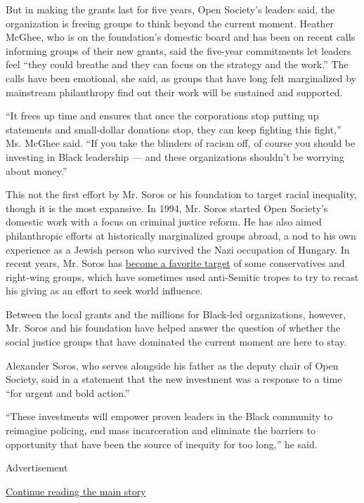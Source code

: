 But in making the grants last for five years, Open Society's leaders
said, the organization is freeing groups to think beyond the current
moment. Heather McGhee, who is on the foundation's domestic board and
has been on recent calls informing groups of their new grants, said the
five-year commitments let leaders feel ``they could breathe and they can
focus on the strategy and the work.'' The calls have been emotional, she
said, as groups that have long felt marginalized by mainstream
philanthropy find out their work will be sustained and supported.

``It frees up time and ensures that once the corporations stop putting
up statements and small-dollar donations stop, they can keep fighting
this fight,'' Ms. McGhee said. ``If you take the blinders of racism off,
of course you should be investing in Black leadership --- and these
organizations shouldn't be worrying about money.''

This not the first effort by Mr. Soros or his foundation to target
racial inequality, though it is the most expansive. In 1994, Mr. Soros
started Open Society's domestic work with a focus on criminal justice
reform. He has also aimed philanthropic efforts at historically
marginalized groups abroad, a nod to his own experience as a Jewish
person who survived the Nazi occupation of Hungary. In recent years, Mr.
Soros has
\href{https://www.nytimes.com/2018/10/31/us/politics/george-soros-bombs-trump.html}{become
a favorite target} of some conservatives and right-wing groups, which
have sometimes used anti-Semitic tropes to try to recast his giving as
an effort to seek world influence.

Between the local grants and the millions for Black-led organizations,
however, Mr. Soros and his foundation have helped answer the question of
whether the social justice groups that have dominated the current moment
are here to stay.

Alexander Soros, who serves alongside his father as the deputy chair of
Open Society, said in a statement that the new investment was a response
to a time ``for urgent and bold action.''

``These investments will empower proven leaders in the Black community
to reimagine policing, end mass incarceration and eliminate the barriers
to opportunity that have been the source of inequity for too long,'' he
said.

Advertisement

\protect\hyperlink{after-bottom}{Continue reading the main story}

